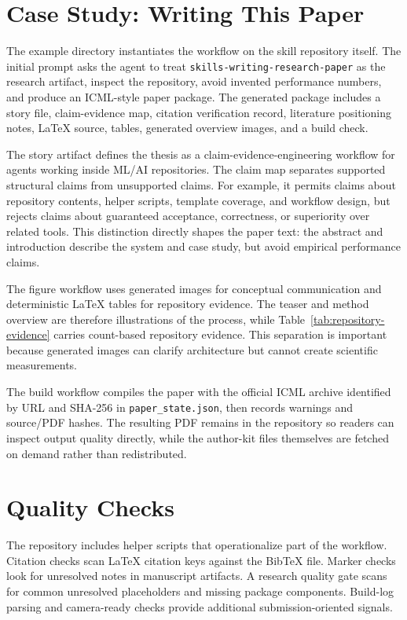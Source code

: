 \documentclass{article}
\begin{document}
\section{Case Study: Writing This Paper}

The example directory instantiates the workflow on the skill repository itself. The initial prompt asks the agent to treat \texttt{skills-writing-research-paper} as the research artifact, inspect the repository, avoid invented performance numbers, and produce an ICML-style paper package. The generated package includes a story file, claim-evidence map, citation verification record, literature positioning notes, LaTeX source, tables, generated overview images, and a build check.

The story artifact defines the thesis as a claim-evidence-engineering workflow for agents working inside ML/AI repositories. The claim map separates supported structural claims from unsupported claims. For example, it permits claims about repository contents, helper scripts, template coverage, and workflow design, but rejects claims about guaranteed acceptance, correctness, or superiority over related tools. This distinction directly shapes the paper text: the abstract and introduction describe the system and case study, but avoid empirical performance claims.

The figure workflow uses generated images for conceptual communication and deterministic LaTeX tables for repository evidence. The teaser and method overview are therefore illustrations of the process, while Table~\ref{tab:repository-evidence} carries count-based repository evidence. This separation is important because generated images can clarify architecture but cannot create scientific measurements.

The build workflow compiles the paper with the official ICML archive identified by URL and SHA-256 in \texttt{paper\_state.json}, then records warnings and source/PDF hashes. The resulting PDF remains in the repository so readers can inspect output quality directly, while the author-kit files themselves are fetched on demand rather than redistributed.

\section{Quality Checks}

The repository includes helper scripts that operationalize part of the workflow. Citation checks scan LaTeX citation keys against the BibTeX file. Marker checks look for unresolved notes in manuscript artifacts. A research quality gate scans for common unresolved placeholders and missing package components. Build-log parsing and camera-ready checks provide additional submission-oriented signals.
\end{document}
